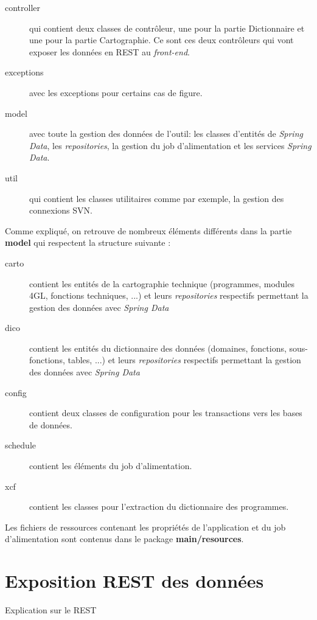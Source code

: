 \documentclass{polytech/polytech}
\begin{document}
\begin{description}
	\item[controller] qui contient deux classes de contrôleur, une pour la partie Dictionnaire et une pour la partie Cartographie. Ce sont ces deux contrôleurs qui vont exposer les données en REST au \textit{front-end}. 
	\item[exceptions] avec les exceptions pour certains cas de figure.
	\item[model] avec toute la gestion des données de l'outil: les classes d'entités de \textit{Spring Data}, les \textit{repositories}, la gestion du job d'alimentation et les services \textit{Spring Data}.
	\item[util] qui contient les classes utilitaires comme par exemple, la gestion des connexions SVN.
\end{description}

Comme expliqué, on retrouve de nombreux éléments différents dans la partie \textbf{model} qui respectent la structure suivante : 

\begin{description}
	\item[carto] contient les entités de la cartographie technique (programmes, modules 4GL, fonctions techniques, ...) et leurs \textit{repositories} respectifs permettant la gestion des données avec \textit{Spring Data}
	\item[dico] contient les entités du dictionnaire des données (domaines, fonctions, sous-fonctions, tables, ...) et leurs \textit{repositories} respectifs permettant la gestion des données avec \textit{Spring Data}
	\item[config] contient deux classes de configuration pour les transactions vers les bases de données.
	\item[schedule] contient les éléments du job d'alimentation.
	\item[xcf] contient les classes pour l'extraction du dictionnaire des programmes.
\end{description}

Les fichiers de ressources contenant les propriétés de l'application et du job d'alimentation sont contenus dans le package \textbf{main/resources}.

\chapter{Exposition REST des données}

Explication sur le REST
\end{document}
